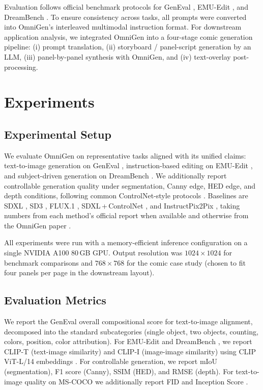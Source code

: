 \documentclass[conference]{IEEEtran}
\begin{document}
Evaluation follows official benchmark protocols for GenEval \cite{geneval}, EMU-Edit \cite{emuedit}, and DreamBench \cite{dreambench}. To ensure consistency across tasks, all prompts were converted into OmniGen's interleaved multimodal instruction format. For downstream application analysis, we integrated OmniGen into a four-stage comic generation pipeline: (i) prompt translation, (ii) storyboard / panel-script generation by an LLM, (iii) panel-by-panel synthesis with OmniGen, and (iv) text-overlay post-processing.

\section{Experiments}
\label{sec:experiments}

\subsection{Experimental Setup}
We evaluate OmniGen on representative tasks aligned with its unified claims: text-to-image generation on GenEval \cite{geneval}, instruction-based editing on EMU-Edit \cite{emuedit}, and subject-driven generation on DreamBench \cite{dreambench}. We additionally report controllable generation quality under segmentation, Canny edge, HED edge, and depth conditions, following common ControlNet-style protocols \cite{controlnet}. Baselines are SDXL \cite{podell2023sdxl}, SD3 \cite{sd3}, FLUX.1 \cite{flux2024}, SDXL\,+\,ControlNet \cite{controlnet}, and InstructPix2Pix \cite{brooks2023instructpix2pix}, taking numbers from each method's official report when available and otherwise from the OmniGen paper \cite{omnigen2024}.

All experiments were run with a memory-efficient inference configuration on a single NVIDIA A100 80\,GB GPU. Output resolution was $1024\times 1024$ for benchmark comparisons and $768\times 768$ for the comic case study (chosen to fit four panels per page in the downstream layout).

\subsection{Evaluation Metrics}
We report the GenEval overall compositional score \cite{geneval} for text-to-image alignment, decomposed into the standard subcategories (single object, two objects, counting, colors, position, color attribution). For EMU-Edit \cite{emuedit} and DreamBench \cite{dreambench}, we report CLIP-T (text-image similarity) and CLIP-I (image-image similarity) using CLIP ViT-L/14 embeddings \cite{radford2021learning}. For controllable generation, we report mIoU (segmentation), F1 score (Canny), SSIM (HED), and RMSE (depth). For text-to-image quality on MS-COCO \cite{lin2014microsoft} we additionally report FID \cite{heusel2017gans} and Inception Score \cite{salimans2016improved}.
\end{document}
